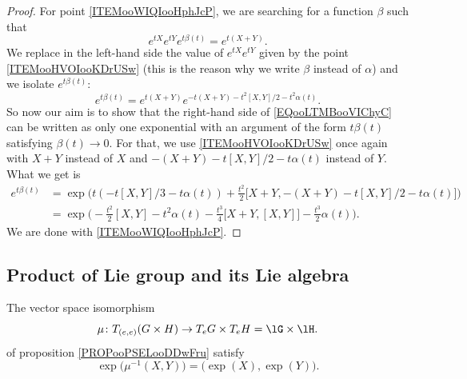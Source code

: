 \begin{proof}
	For point \ref{ITEMooWIQIooHphJcP}, we are searching for a function \( \beta\) such that
	\begin{equation}
		e^{tX} e^{tY} e^{t\beta(t)}= e^{t(X+Y)}.
	\end{equation}
	We replace in the left-hand side the value of \(  e^{tX} e^{tY}\) given by the point \ref{ITEMooHVOIooKDrUSw} (this is the reason why we write \( \beta\) instead of \( \alpha\)) and we isolate \(  e^{t\beta(t)}\):
	\begin{equation}        \label{EQooLTMBooVIChyC}
		e^{t\beta(t)}= e^{t(X+Y)} e^{-t(X+Y)-t^2[X,Y]/2-t^2\alpha(t)}.
	\end{equation}
	So now our aim is to show that the right-hand side of \eqref{EQooLTMBooVIChyC} can be written as only one exponential with an argument of the form \( t\beta(t)\) satisfying \( \beta(t)\to 0\). For that, we use \ref{ITEMooHVOIooKDrUSw} once again with \( X+Y\) instead of \( X\) and \( -(X+Y)-t[X,Y]/2-t\alpha(t)\) instead of \( Y\). What we get is
	\begin{subequations}
		\begin{align}
			e^{t\beta(t)} & =\exp\big( t(-t[X,Y]/3-t\alpha(t))+\frac{ t^2 }{2}\big[ X+Y,-(X+Y)-t[X,Y]/2-t\alpha(t) \big] \big)                        \\
			              & =\exp\big( -\frac{ t^2 }{2}[X,Y]  -t^2\alpha(t)-\frac{ t^3 }{ 4 }\big[ X+Y,[X,Y] \big]-\frac{ t^3 }{ 2 }\alpha(t)  \big).
		\end{align}
	\end{subequations}
	We are done with \ref{ITEMooWIQIooHphJcP}.
\end{proof}


\subsection{Product of Lie group and its Lie algebra}

\begin{lemma}	\label{LEMooTNXEooUBpJFv}
	The vector space isomorphism
	\begin{equation}
		\mu \colon T_{(e,e)}(G\times H)\to T_eG\times T_eH=\lG\times \lH.
	\end{equation}
	of proposition \ref{PROPooPSELooDDwFru} satisfy
	\begin{equation}		\label{EQooOLTGooPIczEJ}
		\exp\big( \mu^{-1}(X,Y) \big)=\big( \exp(X),\exp(Y) \big).
	\end{equation}
\end{lemma}

